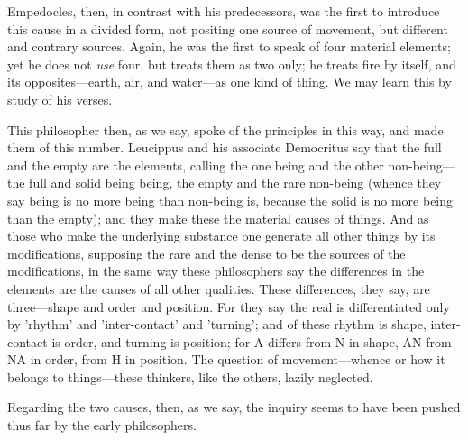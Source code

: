 Empedocles, then, in contrast with his predecessors, was the first to introduce this cause in a divided form, not positing one source of movement, but different and contrary sources. Again, he was the first to speak of four material elements; yet he does not \emph{use} four, but treats them as two only; he treats fire by itself, and its opposites—earth, air, and water—as one kind of thing. We may learn this by study of his verses.

This philosopher then, as we say, spoke of the principles in this way, and made them of this number. Leucippus and his associate Democritus say that the full and the empty are the elements, calling the one being and the other non-being—the full and solid being being, the empty and the rare non-being (whence they say being is no more being than non-being is, because the solid is no more being than the empty); and they make these the material causes of things. And as those who make the underlying substance one generate all other things by its modifications, supposing the rare and the dense to be the sources of the modifications, in the same way these philosophers say the differences in the elements are the causes of all other qualities. These differences, they say, are three—shape and order and position. For they say the real is differentiated only by 'rhythm' and 'inter-contact' and 'turning'; and of these rhythm is shape, inter-contact is order, and turning is position; for A differs from N in shape, AN from NA in order,  from H in position. The question of movement—whence or how it belongs to things—these thinkers, like the others, lazily neglected.

Regarding the two causes, then, as we say, the inquiry seems to have been pushed thus far by the early philosophers.


